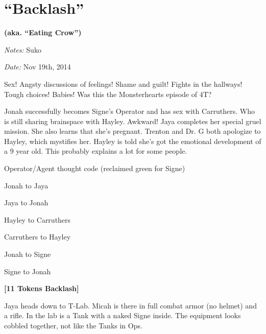 \setcounter{chapter}{ 36 }
\chapter{\textbf{``Backlash''} }




\begin{center}
 {\LARGE \textbf{(aka. ``Eating Crow'')} } 
\end{center}




\textit{Notes:} Suko

\textit{Date:} Nov 19th, 2014



Sex!  Angsty discussions of feelings!  Shame and guilt!  Fights in the hallways!  Tough choices!  Babies!   Was this the Monsterhearts episode of 4T?



Jonah successfully becomes Signe's Operator and has sex with Carruthers.  Who is still sharing brainspace with Hayley.  Awkward!  Jaya completes her special gruel mission.  She also learns that she's pregnant.  Trenton and Dr. G both apologize to Hayley, which mystifies her.  Hayley is told she's got the emotional development of a 9 year old.  This probably explains a lot for some people.



Operator/Agent thought code (reclaimed green for Signe)

 {\color[RGB]{74,134,232}Jonah to Jaya} 

 {\color[RGB]{255,0,0}Jaya to Jonah} 

 {\color[RGB]{230,145,56}Hayley to Carruthers} 

 {\color[RGB]{153,0,255}Carruthers to Hayley } 

 {\color[RGB]{194,123,160}Jonah to Signe} 

 {\color[RGB]{106,168,79}Signe to Jonah} 



\noindent\hrulefill





\textbf{{[}11 Tokens Backlash{]}}



Jaya heads down to T-Lab.  Micah is there in full combat armor (no helmet) and a rifle.  In the lab is a Tank with a naked Signe inside.  The equipment looks cobbled together, not like the Tanks in Ops.




